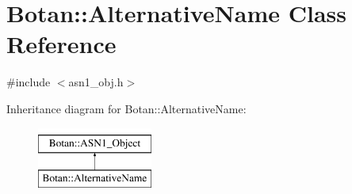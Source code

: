 \hypertarget{classBotan_1_1AlternativeName}{\section{Botan\-:\-:Alternative\-Name Class Reference}
\label{classBotan_1_1AlternativeName}
}


{\ttfamily \#include $<$asn1\-\_\-obj.\-h$>$}

Inheritance diagram for Botan\-:\-:Alternative\-Name\-:\begin{figure}[H]
\begin{center}
\leavevmode
\includegraphics[height=2.000000cm]{classBotan_1_1AlternativeName}
\end{center}
\end{figure}
